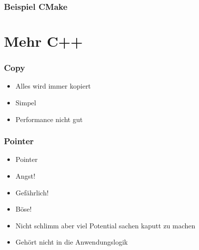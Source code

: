 \documentclass[aspectratio=169]{beamer}
\begin{document}
\begin{frame}
    \frametitle{Beispiel CMake}
\end{frame}


\section{Mehr C++}

\begin{frame}
    \frametitle{Copy}
    \begin{itemize}
        \item Alles wird immer kopiert 
            \pause
        \item Simpel 
            \pause
        \item Performance nicht gut
    \end{itemize}
\end{frame}

\begin{frame}
    \frametitle{Pointer}
    \begin{itemize}
        \item Pointer 
            \pause
        \item Angst!
            \pause
        \item Gefährlich!
            \pause
        \item Böse!
            \pause
        \item Nicht schlimm aber viel Potential sachen kaputt zu machen
            \pause
        \item Gehört nicht in die Anwendungslogik
    \end{itemize}
\end{frame}
\end{document}
